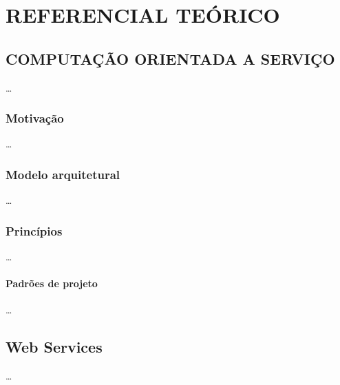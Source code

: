  
\chapter{REFERENCIAL TEÓRICO}
\vspace{-6mm}
% 
\section{COMPUTAÇÃO ORIENTADA A SERVIÇO}
\vspace{-6mm}

\ldots

\vspace{-6mm}

\subsection{Motivação }
\vspace{-6mm}

\ldots

\vspace{-6mm}

\subsection{Modelo arquitetural}
\vspace{-6mm}
\ldots

\vspace{-6mm}

\subsection{Princípios}
\vspace{-6mm}
\ldots

\vspace{-6mm}

\subsubsection{Padrões de projeto }
\vspace{-6mm}

\ldots

\vspace{-6mm}

\section{Web Services}
\vspace{-6mm}

\ldots

